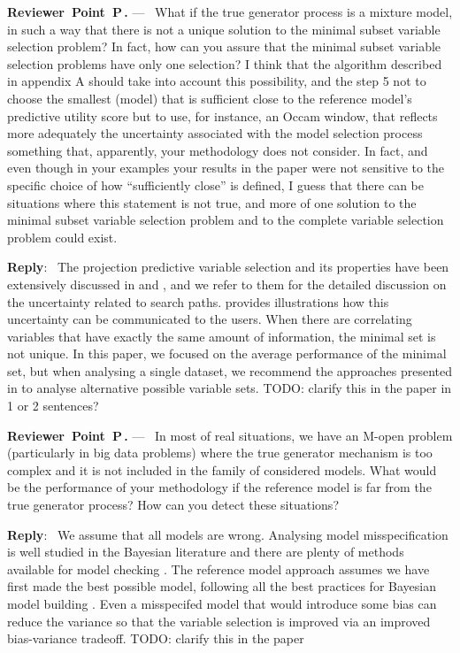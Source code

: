 \documentclass[11pt]{article}
\newcounter{reviewer}
\newcounter{point}[reviewer]
\renewcommand{\thepoint}{P\,\thereviewer.\arabic{point}}
\newenvironment{point}
   {\refstepcounter{point} \bigskip \noindent \begin{sf}{\textbf{Reviewer~Point~\thepoint} } ---\ }
   {\par \end{sf}}
\newenvironment{reply}
   {\medskip \noindent \textbf{Reply}:\  }
   {\medskip}
\begin{document}
\begin{point}
What if the true generator process is a mixture model, in such a way that there is not a unique solution to the minimal subset variable selection problem? In fact, how can you assure that the minimal subset variable selection problems have only one selection? I think that the algorithm described in appendix A should take into account this possibility, and the step 5 not to choose the smallest (model) that is sufficient close to the reference model's predictive utility score but to use, for instance, an Occam window, that reflects more adequately the uncertainty associated with the model selection process something that, apparently, your methodology does not consider. In fact, and even though in your examples your results in the paper were not sensitive to the specific choice of how “sufficiently close” is defined, I guess that there can be situations where this statement is not true, and more of one solution to the minimal subset variable selection problem and to the complete variable selection problem could exist.
\end{point}

\begin{reply}
The projection predictive variable selection and its properties have been extensively discussed in \citet{piironen2017comparison} and \citet{piironen2020projective}, and we refer to them for the detailed discussion on the uncertainty related to search paths. \citet{paasiniemi2018} provides illustrations how this uncertainty can be communicated to the users. When there are correlating variables that have exactly the same amount of information, the minimal set is not unique. In this paper, we focused on the average performance of the minimal set, but when analysing a single dataset, we recommend the approaches presented in \citet{paasiniemi2018} to analyse alternative possible variable sets.
TODO: clarify this in the paper in 1 or 2 sentences?
\end{reply}

\begin{point}
In most of real situations, we have an M-open problem (particularly in big data problems) where the true generator mechanism is too complex and it is not included in the family of considered models. What would be the performance of your methodology if the reference model is far from the true generator process? How can you detect these situations?
\end{point}

\begin{reply}
We assume that all models are wrong. Analysing model misspecification is well studied in the Bayesian literature and there are plenty of methods available for model checking \citep[see, e.g.][]{gelman2020bayesian}. The reference model approach assumes we have first made the best possible model, following all the best practices for Bayesian model building \citep{gelman2020bayesian}. Even a misspecifed model that would introduce some bias can reduce the variance so that the variable selection is improved via an improved bias-variance tradeoff.
TODO: clarify this in the paper 
\end{reply}
\end{document}
